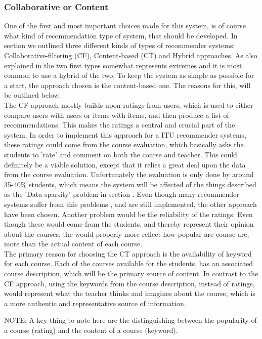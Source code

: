 \subsubsection*{Collaborative or Content}
One of the first and most important choices made for this system, is of course what kind of recommendation type of system, that should be developed. In section  we outlined three different kinds of types of recommender systems: Collaborative-filtering (CF), Content-based (CT) and Hybrid approaches. As also explained in  the two first types somewhat represents extremes and it is most common to use a hybrid of the two. To keep the system as simple as possible for a start, the approach chosen is the content-based one. The reasons for this, will be outlined below. \\
The CF approach mostly builds upon ratings from users, which is used to either compare users with users or items with items, and then produce a list of recommendations. This makes the ratings a central and crucial part of the system. In order to implement this approach for a ITU recommender systems, these ratings could come from the course evaluation, which basically asks the students to 'rate' and comment on both the course and teacher. This could definitely be a viable solution, except that it relies a great deal upon the data from the course evaluation. Unfortunately the evaluation is only done by around 35-40\% students, which means the system will be affected of the things described as the 'Data sparsity' problem in section . Even though many recommender systems suffer from this problems , and are still implemented, the other approach have been chosen. Another problem would be the reliability of the ratings. Even though these would come from the students, and thereby represent their opinion about the courses, the would properly more reflect how popular are course are, more than the actual content of each course.\\ 
The primary reason for choosing the CT approach is the availability of keyword for each course. Each of the courses available for the students, has an associated course description, which will be the primary source of content. In contrast to the CF approach, using the keywords from the course description, instead of ratings, would represent what the teacher thinks and imagines about the course, which is a more authentic and representative source of information. 

NOTE: A key thing to note here are the distinguishing between the popularity of a course (rating) and the content of a course (keyword).

